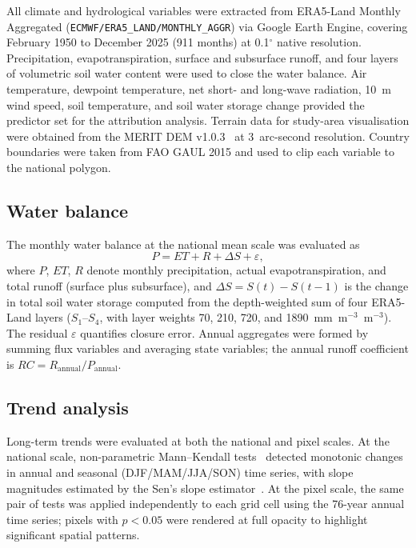 \documentclass[11pt]{article}
\begin{document}
All climate and hydrological variables were extracted from ERA5-Land Monthly Aggregated (\texttt{ECMWF/\allowbreak ERA5\_\allowbreak LAND/\allowbreak MONTHLY\_\allowbreak AGGR}) via Google Earth Engine, covering February 1950 to December 2025 (911 months) at 0.1$^\circ$ native resolution. Precipitation, evapotranspiration, surface and subsurface runoff, and four layers of volumetric soil water content were used to close the water balance. Air temperature, dewpoint temperature, net short- and long-wave radiation, 10~m wind speed, soil temperature, and soil water storage change provided the predictor set for the attribution analysis. Terrain data for study-area visualisation were obtained from the MERIT DEM v1.0.3~\cite{yamazaki2017merit} at 3~arc-second resolution. Country boundaries were taken from FAO GAUL 2015 and used to clip each variable to the national polygon.

\subsection{Water balance}

The monthly water balance at the national mean scale was evaluated as
\begin{equation}
P = ET + R + \Delta S + \varepsilon,
\end{equation}
where $P$, $ET$, $R$ denote monthly precipitation, actual evapotranspiration, and total runoff (surface plus subsurface), and $\Delta S = S(t) - S(t-1)$ is the change in total soil water storage computed from the depth-weighted sum of four ERA5-Land layers ($S_1$--$S_4$, with layer weights 70, 210, 720, and 1890~mm~m$^{-3}$~m$^{-3}$). The residual $\varepsilon$ quantifies closure error. Annual aggregates were formed by summing flux variables and averaging state variables; the annual runoff coefficient is $RC = R_\mathrm{annual}/P_\mathrm{annual}$.

\subsection{Trend analysis}

Long-term trends were evaluated at both the national and pixel scales. At the national scale, non-parametric Mann--Kendall tests~\cite{mann1945} detected monotonic changes in annual and seasonal (DJF/\allowbreak MAM/\allowbreak JJA/\allowbreak SON) time series, with slope magnitudes estimated by the Sen's slope estimator~\cite{sen1968}. At the pixel scale, the same pair of tests was applied independently to each grid cell using the 76-year annual time series; pixels with $p < 0.05$ were rendered at full opacity to highlight significant spatial patterns.
\end{document}
